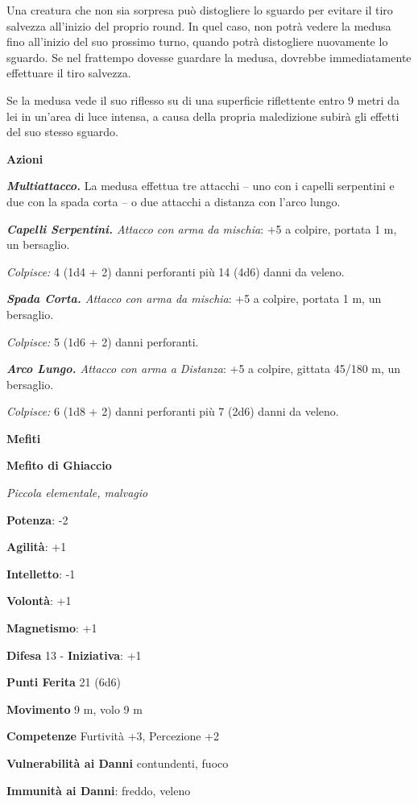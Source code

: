 \begin{multicols}{2}
Una creatura che non sia sorpresa può distogliere lo sguardo per evitare
il tiro salvezza all'inizio del proprio round. In quel caso, non potrà
vedere la medusa fino all'inizio del suo prossimo turno, quando potrà
distogliere nuovamente lo sguardo. Se nel frattempo dovesse guardare la
medusa, dovrebbe immediatamente effettuare il tiro salvezza.

Se la medusa vede il suo riflesso su di una superficie riflettente entro
9 metri da lei in un'area di luce intensa, a causa della propria
maledizione subirà gli effetti del suo stesso sguardo.

\smallskip\textbf{Azioni}

\emph{\textbf{Multiattacco.}} La medusa effettua tre attacchi -- uno con
i capelli serpentini e due con la spada corta -- o due attacchi a
distanza con l'arco lungo.

\emph{\textbf{Capelli Serpentini.} Attacco con arma da mischia}: +5 a
colpire, portata 1 m, un bersaglio.

\emph{Colpisce:} 4 (1d4 + 2) danni perforanti più 14 (4d6) danni da
veleno.

\emph{\textbf{Spada Corta.} Attacco con arma da mischia}: +5 a colpire,
portata 1 m, un bersaglio.

\emph{Colpisce:} 5 (1d6 + 2) danni perforanti.

\emph{\textbf{Arco Lungo.} Attacco con arma a Distanza}: +5 a colpire,
gittata 45/180 m, un bersaglio.

\emph{Colpisce:} 6 (1d8 + 2) danni perforanti più 7 (2d6) danni da
veleno.

\textbf{Mefiti}

\textbf{Mefito di Ghiaccio}

\emph{Piccola elementale, malvagio}

\textbf{Potenza}: -2

\textbf{Agilità}: +1

\textbf{Intelletto}: -1

\textbf{Volontà}: +1

\textbf{Magnetismo}: +1

\textbf{Difesa} 13 - \textbf{Iniziativa}: +1

\textbf{Punti Ferita} 21 (6d6)

\textbf{Movimento} 9 m, volo 9 m

\textbf{Competenze} Furtività +3, Percezione +2

\textbf{Vulnerabilità ai Danni} contundenti, fuoco

\textbf{Immunità ai Danni}: freddo, veleno


\end{multicols}
